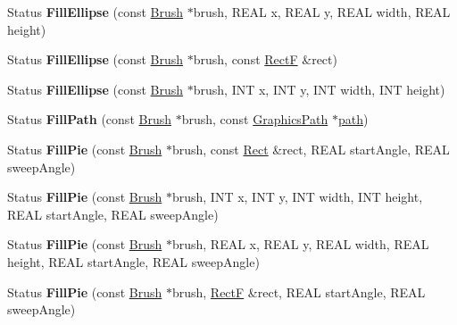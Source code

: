 \begin{DoxyCompactItemize}
Status {\bfseries Fill\+Ellipse} (const \hyperlink{class_brush}{Brush} $\ast$brush, R\+E\+AL x, R\+E\+AL y, R\+E\+AL width, R\+E\+AL height)
\item 
\mbox{\label{class_graphics_a3c5cc1a47904118a2dda890d5fe4171b}} 
Status {\bfseries Fill\+Ellipse} (const \hyperlink{class_brush}{Brush} $\ast$brush, const \hyperlink{struct_rect_f}{RectF} \&rect)
\item 
\mbox{\label{class_graphics_a3abd21c0a5928db6c8414fa2c669ed34}} 
Status {\bfseries Fill\+Ellipse} (const \hyperlink{class_brush}{Brush} $\ast$brush, I\+NT x, I\+NT y, I\+NT width, I\+NT height)
\item 
\mbox{\label{class_graphics_a6c004dbc56f2a399c720d25f229417a3}} 
Status {\bfseries Fill\+Path} (const \hyperlink{class_brush}{Brush} $\ast$brush, const \hyperlink{class_graphics_path}{Graphics\+Path} $\ast$\hyperlink{structpath}{path})
\item 
\mbox{\label{class_graphics_afbc092738da12d7d687a8f6ea483e4d0}} 
Status {\bfseries Fill\+Pie} (const \hyperlink{class_brush}{Brush} $\ast$brush, const \hyperlink{struct_rect}{Rect} \&rect, R\+E\+AL start\+Angle, R\+E\+AL sweep\+Angle)
\item 
\mbox{\label{class_graphics_aef7f333357e330543b1b6f55ab05d829}} 
Status {\bfseries Fill\+Pie} (const \hyperlink{class_brush}{Brush} $\ast$brush, I\+NT x, I\+NT y, I\+NT width, I\+NT height, R\+E\+AL start\+Angle, R\+E\+AL sweep\+Angle)
\item 
\mbox{\label{class_graphics_a4b749d1c5d149a2c67542fef6e30959b}} 
Status {\bfseries Fill\+Pie} (const \hyperlink{class_brush}{Brush} $\ast$brush, R\+E\+AL x, R\+E\+AL y, R\+E\+AL width, R\+E\+AL height, R\+E\+AL start\+Angle, R\+E\+AL sweep\+Angle)
\item 
\mbox{\label{class_graphics_aa6aa86090d59ad34204309657ea79c90}} 
Status {\bfseries Fill\+Pie} (const \hyperlink{class_brush}{Brush} $\ast$brush, \hyperlink{struct_rect_f}{RectF} \&rect, R\+E\+AL start\+Angle, R\+E\+AL sweep\+Angle)
\item 
\mbox{\label{class_graphics_aded42b5f60a6f6756cae4c69a30581ce}} 

\end{DoxyCompactItemize}
